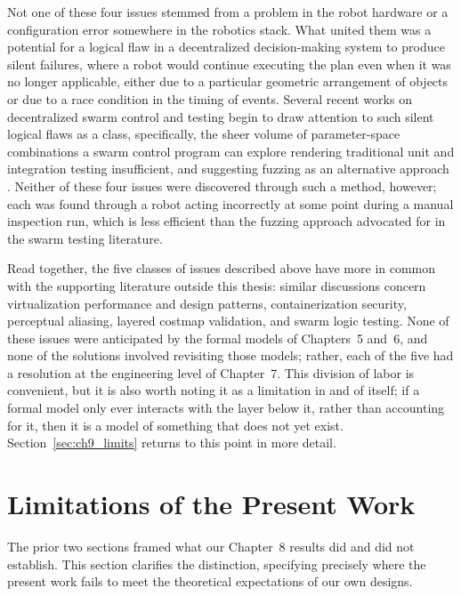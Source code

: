 Not one of these four issues stemmed from a problem in the robot hardware or a configuration error somewhere in the robotics stack. What united them was a potential for a logical flaw in a decentralized decision-making system to produce silent failures, where a robot would continue executing the plan even when it was no longer applicable, either due to a particular geometric arrangement of objects or due to a race condition in the timing of events. Several recent works on decentralized swarm control and testing begin to draw attention to such silent logical flaws as a class, specifically, the sheer volume of parameter-space combinations a swarm control program can explore rendering traditional unit and integration testing insufficient, and suggesting fuzzing as an alternative approach \cite{zhou2025rsfuzz}. Neither of these four issues were discovered through such a method, however; each was found through a robot acting incorrectly at some point during a manual inspection run, which is less efficient than the fuzzing approach advocated for in the swarm testing literature.

Read together, the five classes of issues described above have more in common with the supporting literature outside this thesis: similar discussions concern virtualization performance and design patterns, containerization security, perceptual aliasing, layered costmap validation, and swarm logic testing. None of these issues were anticipated by the formal models of Chapters~5 and~6, and none of the solutions involved revisiting those models; rather, each of the five had a resolution at the engineering level of Chapter~7. This division of labor is convenient, but it is also worth noting it as a limitation in and of itself; if a formal model only ever interacts with the layer below it, rather than accounting for it, then it is a model of something that does not yet exist. Section~\ref{sec:ch9_limits} returns to this point in more detail.

\section{Limitations of the Present Work\label{sec:ch9_limits}}

The prior two sections framed what our Chapter~8 results did and did not establish. This section clarifies the distinction, specifying precisely where the present work fails to meet the theoretical expectations of our own designs.

